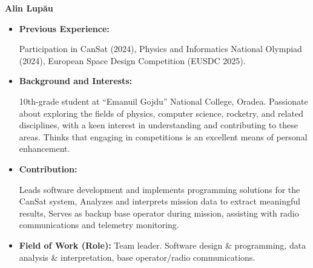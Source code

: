 \item[] \textbf{Alin Lup\u{a}u}
    \begin{itemize}[label=]
        \item[\faCogs] \textbf{Previous Experience:}         \begin{itemize}[label=\textbullet]
                \myitemtwo Participation in CanSat (2024), 
                \myitemtwo Physics and Informatics National Olympiad (2024), 
                \myitemtwo European Space Design Competition (EUSDC 2025). 
            \end{itemize}
        \item[\faGraduationCap] \textbf{Background and Interests:} 
            \begin{itemize}[label=\textbullet]
                \myitemtwo 10th-grade student at “Emanuil Gojdu” National College, Oradea.
                \myitemtwo Passionate about exploring the fields of physics, computer science, rocketry, and related disciplines, with a keen interest in understanding and contributing to these areas.
                \myitemtwo Thinks that engaging in competitions is an excellent means of personal enhancement.
            \end{itemize}
        \item[\faEdit] \textbf{Contribution:} 
            \begin{itemize}[label=\textbullet]
                \myitemtwo Leads software development and implements programming solutions for the CanSat system,
                \myitemtwo Analyzes and interprets mission data to extract meaningful results,
                \myitemtwo Serves as backup base operator during mission, assisting with radio communications and telemetry monitoring. 
            \end{itemize}
        \item[\faMicroscope] \textbf{Field of Work (Role):} Team leader. Software design \& programming, data analysis \& interpretation, base operator/radio communications.
    \end{itemize}
    \vspace{0.2 cm}
    